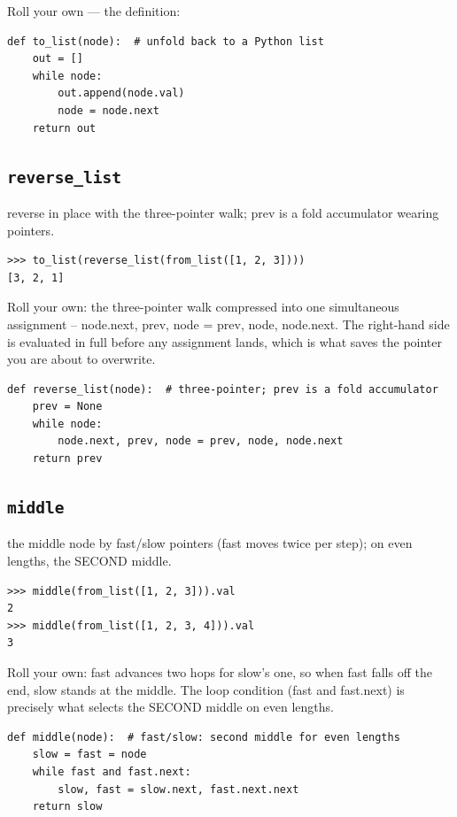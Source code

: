 \documentclass[10pt,letterpaper]{book}
\begin{document}
Roll your own --- the definition:

\begin{lstlisting}[style=ex]
def to_list(node):  # unfold back to a Python list
    out = []
    while node:
        out.append(node.val)
        node = node.next
    return out
\end{lstlisting}
\subsection{\texttt{reverse\_list}}\label{def:reverse-list}
reverse in place with the three-pointer walk; prev is a fold accumulator wearing pointers.
\begin{lstlisting}[style=ex]
>>> to_list(reverse_list(from_list([1, 2, 3])))
[3, 2, 1]
\end{lstlisting}

Roll your own: the three-pointer walk compressed into one simultaneous assignment -- node.next, prev, node = prev, node, node.next. The right-hand side is evaluated in full before any assignment lands, which is what saves the pointer you are about to overwrite.

\begin{lstlisting}[style=ex]
def reverse_list(node):  # three-pointer; prev is a fold accumulator
    prev = None
    while node:
        node.next, prev, node = prev, node, node.next
    return prev
\end{lstlisting}
\subsection{\texttt{middle}}\label{def:middle}
the middle node by fast/slow pointers (fast moves twice per step); on even lengths, the SECOND middle.
\begin{lstlisting}[style=ex]
>>> middle(from_list([1, 2, 3])).val
2
>>> middle(from_list([1, 2, 3, 4])).val
3
\end{lstlisting}

Roll your own: fast advances two hops for slow's one, so when fast falls off the end, slow stands at the middle. The loop condition (fast and fast.next) is precisely what selects the SECOND middle on even lengths.

\begin{lstlisting}[style=ex]
def middle(node):  # fast/slow: second middle for even lengths
    slow = fast = node
    while fast and fast.next:
        slow, fast = slow.next, fast.next.next
    return slow
\end{lstlisting}
\end{document}
